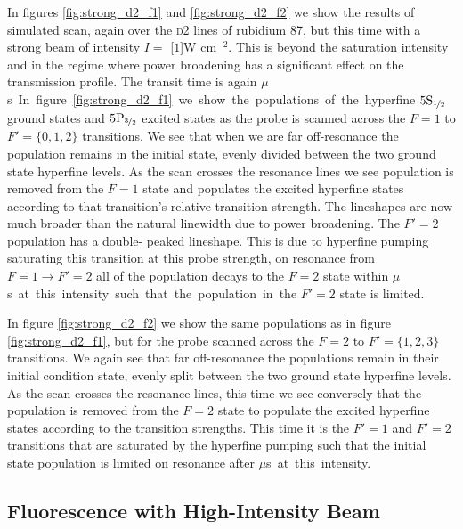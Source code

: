     In figures \ref{fig:strong_d2_f1} and \ref{fig:strong_d2_f2} we show the
    results of simulated scan, again over the \textsc{d2} lines of rubidium 87,
    but this time with a strong beam of intensity $I = $ \unit[$1$]{W
    cm$^{-2}$}. This is beyond the saturation intensity and in the regime where
    power broadening has a significant effect on the transmission profile. The
    transit time is again \unit[2]{$\mu$s}.

    In figure \ref{fig:strong_d2_f1} we show the populations of the hyperfine
    $5\rm{S}_{\nicefrac{1}{2}}$ ground states and
    $5\rm{P}_{\nicefrac{3}{2}}$ excited states as the probe is scanned across
    the $F = 1$ to $F' = \{ 0, 1, 2 \}$ transitions. We see that when we are far
    off-resonance the population remains in the initial state, evenly divided
    between the two ground state hyperfine levels. As the scan crosses the
    resonance lines we see population is removed from the $F = 1$ state and
    populates the excited hyperfine states according to that transition's
    relative transition strength. The lineshapes are now much broader than the
    natural linewidth due to power broadening\cite{loudon2000quantum}. The $F' =
    2$ population has a double- peaked lineshape. This is due to hyperfine
    pumping saturating this transition at this probe strength, \ie on resonance
    from $F = 1 \rightarrow F' = 2$ all of the population decays to the $F = 2$
    state within \unit[2]{$\mu$s} at this intensity such that the population in
    the $F' = 2$ state is limited.

    In figure \ref{fig:strong_d2_f2} we show the same populations as in figure
    \ref{fig:strong_d2_f1}, but for the probe scanned across the $F = 2$ to $F'
    = \{ 1, 2, 3 \}$ transitions. We again see that far off-resonance the
    populations remain in their initial condition state, evenly split between
    the two ground state hyperfine levels. As the scan crosses the resonance
    lines, this time we see conversely that the population is removed from the
    $F = 2$ state to populate the excited hyperfine states according to the
    transition strengths. This time it is the $F' = 1$ and $F' = 2$ transitions
    that are saturated by the hyperfine pumping such that the initial state
    population is limited on resonance after \unit[2]{$\mu$s} at this intensity.

  \subsection{Fluorescence with High-Intensity Beam}

